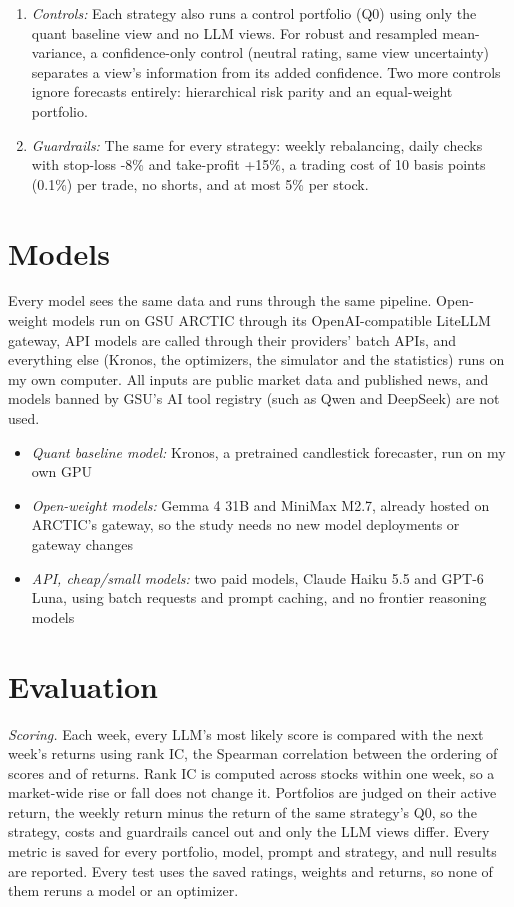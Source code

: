 \documentclass[conference]{IEEEtran}
\begin{document}
\begin{enumerate}
\item \textit{Controls:} Each strategy also runs a control portfolio (Q0) using only the quant baseline view and no LLM views. For robust and resampled mean-variance, a confidence-only control (neutral rating, same view uncertainty) separates a view's information from its added confidence. Two more controls ignore forecasts entirely: hierarchical risk parity and an equal-weight portfolio.
\item \textit{Guardrails:} The same for every strategy: weekly rebalancing, daily checks with stop-loss -8\% and take-profit +15\%, a trading cost of 10 basis points (0.1\%) per trade, no shorts, and at most 5\% per stock.
\end{enumerate}

\section{Models}
Every model sees the same data and runs through the same pipeline. Open-weight models run on GSU ARCTIC through its OpenAI-compatible LiteLLM gateway, API models are called through their providers' batch APIs, and everything else (Kronos, the optimizers, the simulator and the statistics) runs on my own computer. All inputs are public market data and published news, and models banned by GSU's AI tool registry (such as Qwen and DeepSeek) are not used.
\begin{itemize}
\item \textit{Quant baseline model:} Kronos, a pretrained candlestick forecaster, run on my own GPU
\item \textit{Open-weight models:} Gemma 4 31B and MiniMax M2.7, already hosted on ARCTIC's gateway, so the study needs no new model deployments or gateway changes
\item \textit{API, cheap/small models:} two paid models, Claude Haiku 5.5 and GPT-6 Luna, using batch requests and prompt caching, and no frontier reasoning models
\end{itemize}

\section{Evaluation}
\textit{Scoring.} Each week, every LLM's most likely score is compared with the next week's returns using rank IC, the Spearman correlation between the ordering of scores and of returns. Rank IC is computed across stocks within one week, so a market-wide rise or fall does not change it. Portfolios are judged on their active return, the weekly return minus the return of the same strategy's Q0, so the strategy, costs and guardrails cancel out and only the LLM views differ. Every metric is saved for every portfolio, model, prompt and strategy, and null results are reported. Every test uses the saved ratings, weights and returns, so none of them reruns a model or an optimizer.
\end{document}
